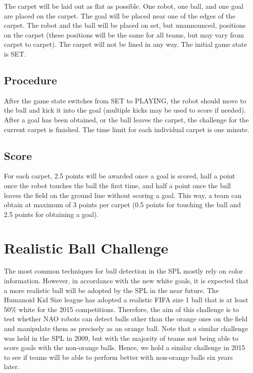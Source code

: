 \documentclass[12pt]{article}
\begin{document}
The carpet will be laid out as flat as possible.  One robot, one ball, and one goal are placed on the carpet. The goal will be placed near one of the edges of the carpet. The robot and the ball will be placed on set, but unannounced, positions on the carpet (these positions will be the same for all teams, but may vary from carpet to carpet).  The carpet will not be lined in any way.  The initial game state is SET.

\subsection{Procedure}

After the game state switches from SET to PLAYING, the robot should move to the ball and kick it into the goal (multiple kicks may be used to score if needed). After a goal has been obtained, or the ball leaves the carpet, the challenge for the current carpet is finished. The time limit for each individual carpet is one minute. 

\subsection{Score}

For each carpet, 2.5 points will be awarded once a goal is scored, half a point once the robot touches the ball the first time, and half a point once the ball leaves the field on the ground line without scoring a goal. This way, a team can obtain at maximum of 3 points per carpet (0.5 points for touching the ball and 2.5 points for obtaining a goal).

\newpage






\section{Realistic Ball Challenge}

The most common techniques for ball detection in the SPL mostly rely on color information. However, in accordance with the new white goals, it is expected that a more realistic ball will be adopted by the SPL in the near future.  The Humanoid Kid Size league has adopted a realistic FIFA size 1 ball that is at least 50\% white for the 2015 competitions.  Therefore, the aim of this challenge is to test whether NAO robots can detect balls other than the orange ones on the field and manipulate them as precisely as an orange ball.  Note that a similar challenge was held in the SPL in 2009, but with the majority of teams not being able to score goals with the non-orange balls.  Hence, we hold a similar challenge in 2015 to see if teams will be able to perform better with non-orange balls six years later.
\end{document}
